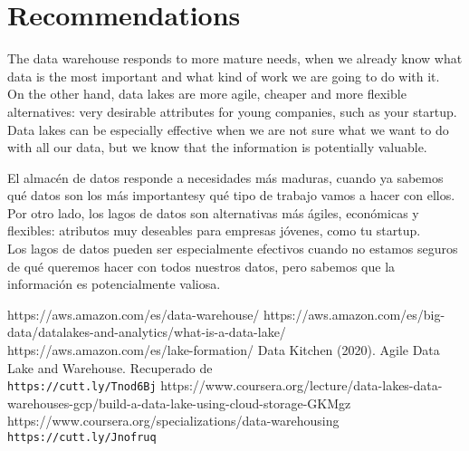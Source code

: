 \documentclass[twocolumn]{article}
\begin{document}
\section{Recommendations}
 \noindent The data warehouse responds to more mature needs, when we already know what data is the most important and what kind of work we are going to do with it.\\[0.1in]
On the other hand, data lakes are more agile, cheaper and more flexible alternatives: very desirable attributes for young companies, such as your startup.\\[0.1in]
Data lakes can be especially effective when we are not sure what we want to do with all our data, but we know that the information is potentially valuable.

\vspace{0.5cm}

 \noindent El almacén de datos responde a necesidades más maduras, cuando ya sabemos qué datos son los más importantesy qué tipo de trabajo vamos a hacer con ellos.\\[0.1in]
Por otro lado, los lagos de datos son alternativas más ágiles, económicas y flexibles: atributos muy deseables para empresas jóvenes, como tu startup.\\[0.1in]
Los lagos de datos pueden ser especialmente efectivos cuando no estamos seguros de qué queremos hacer con todos nuestros datos, pero sabemos que la información es potencialmente valiosa.\\[0.1in]


\begin{thebibliography}{XXX0000}
	\bibitem{}
    https://aws.amazon.com/es/data-warehouse/
    \bibitem{}
    https://aws.amazon.com/es/big-data/datalakes-and-analytics/what-is-a-data-lake/
    \bibitem{}
    https://aws.amazon.com/es/lake-formation/
    \bibitem{}
    Data Kitchen (2020). Agile Data Lake and Warehouse. Recuperado de 
    \\\texttt{https://cutt.ly/Tnod6Bj}
    \bibitem{}
    https://www.coursera.org/lecture/data-lakes-data-warehouses-gcp/build-a-data-lake-using-cloud-storage-GKMgz
    \bibitem{}
    https://www.coursera.org/specializations/data-warehousing
    \\\texttt{https://cutt.ly/Jnofruq}
	\end{thebibliography}

\end{document}
